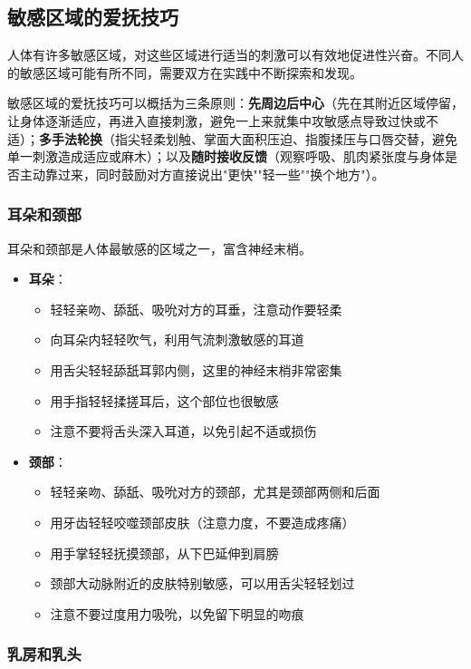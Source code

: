 \documentclass[12pt,UTF8]{ctexbook}
\begin{document}
\subsection{敏感区域的爱抚技巧}

人体有许多敏感区域，对这些区域进行适当的刺激可以有效地促进性兴奋。不同人的敏感区域可能有所不同，需要双方在实践中不断探索和发现。


敏感区域的爱抚技巧可以概括为三条原则：\textbf{先周边后中心}（先在其附近区域停留，让身体逐渐适应，再进入直接刺激，避免一上来就集中攻敏感点导致过快或不适）；\textbf{多手法轮换}（指尖轻柔划触、掌面大面积压迫、指腹揉压与口唇交替，避免单一刺激造成适应或麻木）；以及\textbf{随时接收反馈}（观察呼吸、肌肉紧张度与身体是否主动靠过来，同时鼓励对方直接说出"更快""轻一些""换个地方"）。

\subsubsection{耳朵和颈部}

耳朵和颈部是人体最敏感的区域之一，富含神经末梢。

\begin{itemize}
\item \textbf{耳朵}：
  \begin{itemize}
  \item 轻轻亲吻、舔舐、吸吮对方的耳垂，注意动作要轻柔
  \item 向耳朵内轻轻吹气，利用气流刺激敏感的耳道
  \item 用舌尖轻轻舔舐耳郭内侧，这里的神经末梢非常密集
  \item 用手指轻轻揉搓耳后，这个部位也很敏感
  \item 注意不要将舌头深入耳道，以免引起不适或损伤
  \end{itemize}
\item \textbf{颈部}：
  \begin{itemize}
  \item 轻轻亲吻、舔舐、吸吮对方的颈部，尤其是颈部两侧和后面
  \item 用牙齿轻轻咬噬颈部皮肤（注意力度，不要造成疼痛）
  \item 用手掌轻轻抚摸颈部，从下巴延伸到肩膀
  \item 颈部大动脉附近的皮肤特别敏感，可以用舌尖轻轻划过
  \item 注意不要过度用力吸吮，以免留下明显的吻痕
  \end{itemize}
\end{itemize}

\subsubsection{乳房和乳头}
\end{document}
